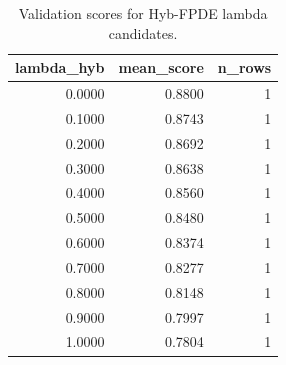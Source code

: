 \begin{table}[t]
\caption{Validation scores for Hyb-FPDE lambda candidates.}
\label{tab:lambda_distribution_computed}
\centering
\begin{tabular}{rrr}
\toprule
lambda\_hyb & mean\_score & n\_rows \\
\midrule
0.0000 & 0.8800 & 1 \\
0.1000 & 0.8743 & 1 \\
0.2000 & 0.8692 & 1 \\
0.3000 & 0.8638 & 1 \\
0.4000 & 0.8560 & 1 \\
0.5000 & 0.8480 & 1 \\
0.6000 & 0.8374 & 1 \\
0.7000 & 0.8277 & 1 \\
0.8000 & 0.8148 & 1 \\
0.9000 & 0.7997 & 1 \\
1.0000 & 0.7804 & 1 \\
\bottomrule
\end{tabular}

\end{table}

